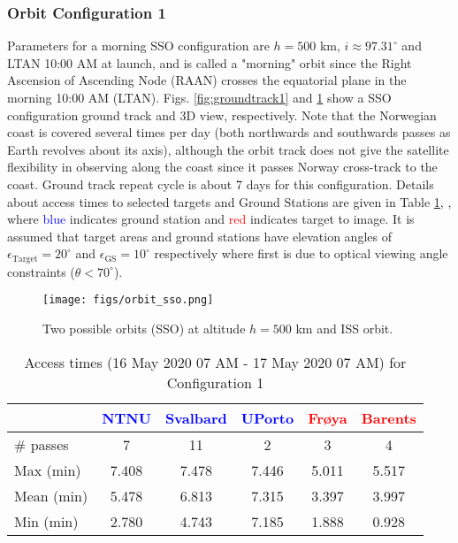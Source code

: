 \subsubsection{Orbit Configuration 1} \label{sec:orbit1}
Parameters for a morning SSO configuration are $h=500$ km, $i\approx 97.31^{\circ}$ and LTAN 10:00 AM at launch, and is called a "morning" orbit since the Right Ascension of Ascending Node (RAAN) crosses the equatorial plane in the morning 10:00 AM (LTAN). Figs. \ref{fig:groundtrack1} and \ref{fig:orbit_sso} show a SSO \sml configuration ground track and 3D view, respectively. Note that the Norwegian coast is covered several times per day (both northwards and southwards passes as Earth revolves about its axis), although the orbit track does not give the satellite flexibility in observing along the coast since it passes Norway cross-track to the coast. Ground track repeat cycle is about 7 days for this configuration.
Details about access times to selected targets and Ground Stations are given in Table \ref{tab:revisit_1}, , where \textcolor{blue}{blue} indicates ground station and \textcolor{red}{red} indicates target to image. It is assumed that target areas and ground stations have elevation angles of $\epsilon_{\text{Target}}=20^{\circ}$ and $\epsilon_{\text{GS}}=10^{\circ}$ respectively where first is due to optical viewing angle constraints ($\theta<70^{\circ}$).
\begin{figure}[htbp]
  \begin{center}
    \texttt{[image: figs/orbit\_sso.png]}
    \caption{Two possible \hypso orbits (SSO) at altitude $h=500$ km and ISS orbit.}
    \label{fig:orbit_sso}
\end{center}
\end{figure}
\begin{table}[htbp]
	\caption{Access times (16 May 2020 07 AM - 17 May 2020 07 AM) for Configuration 1}
	\label{tab:revisit_1}
	\centering
		\begin{tabular}{|l|c|c|c|c|c|}
			\hline
			 & \textcolor{blue}{NTNU} & \textcolor{blue}{Svalbard} & \textcolor{blue}{UPorto}  &  \textcolor{red}{Fr{\o}ya} & \textcolor{red}{Barents} \\
					\hline
			\# passes & 7 & 11 & 2 & 3 & 4 \\
			Max (min) & 7.408 & 7.478 & 7.446 & 5.011 & 5.517 \\
			Mean (min) 	&	5.478	&	6.813 & 7.315 & 3.397 & 3.997  		\\
			Min (min) & 2.780 & 4.743 & 7.185 & 1.888 & 0.928 \\
			\hline
		\end{tabular}
\end{table}
